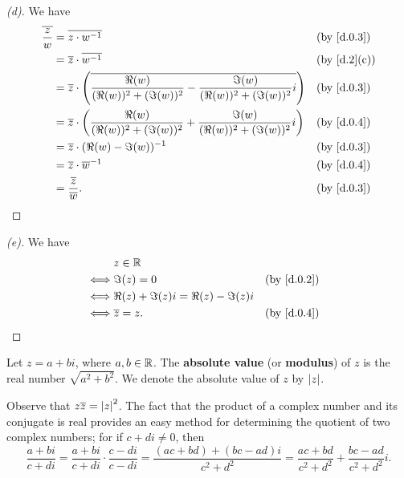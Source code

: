 \begin{proof}[(d)]
  We have
  \begin{align*}
    \conj{\dfrac{z}{w}} & = \conj{z \cdot w^{-1}}                                                                                          &  & \by{d.0.3}  \\
                        & = \conj{z} \cdot \conj{w^{-1}}                                                                                   &  & \by{d.2}[c] \\
                        & = \conj{z} \cdot \pa{\conj{\dfrac{\Re(w)}{(\Re(w))^2 + (\Im(w))^2} - \dfrac{\Im(w)}{(\Re(w))^2 + (\Im(w))^2} i}} &  & \by{d.0.3}  \\
                        & = \conj{z} \cdot \pa{\dfrac{\Re(w)}{(\Re(w))^2 + (\Im(w))^2} + \dfrac{\Im(w)}{(\Re(w))^2 + (\Im(w))^2} i}        &  & \by{d.0.4}  \\
                        & = \conj{z} \cdot (\Re(w) - \Im(w))^{-1}                                                                          &  & \by{d.0.3}  \\
                        & = \conj{z} \cdot \conj{w}^{-1}                                                                                   &  & \by{d.0.4}  \\
                        & = \dfrac{\conj{z}}{\conj{w}}.                                                                                    &  & \by{d.0.3}
  \end{align*}
\end{proof}

\begin{proof}[(e)]
  We have
  \begin{align*}
         & z \in \R                                              \\
    \iff & \Im(z) = 0                            &  & \by{d.0.2} \\
    \iff & \Re(z) + \Im(z) i = \Re(z) - \Im(z) i                 \\
    \iff & \conj{z} = z.                         &  & \by{d.0.4}
  \end{align*}
\end{proof}

\begin{defn}\label{d.0.5}
  Let \(z = a + bi\), where \(a, b \in \mathbb{R}\).
  The \textbf{absolute value} (or \textbf{modulus}) of \(z\) is the real number \(\sqrt{a^2 + b^2}\).
  We denote the absolute value of \(z\) by \(\left\lvert z\right\rvert\).

  Observe that \(z \overline{z} = \left\lvert z\right\rvert^2\).
  The fact that the product of a complex number and its conjugate is real provides an easy method for determining the quotient of two complex numbers;
  for if \(c + di \neq 0\), then
  \[
    \dfrac{a + bi}{c + di} = \dfrac{a + bi}{c + di} \cdot \dfrac{c - di}{c - di} = \dfrac{(ac + bd) + (bc - ad) i}{c^2 + d^2} = \dfrac{ac + bd}{c^2 + d^2} + \dfrac{bc - ad}{c^2 + d^2} i.
  \]
\end{defn}

